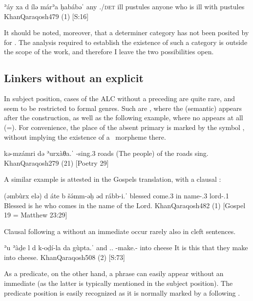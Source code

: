 {ʾáy\cb{} xa \opt\zero{} d\cb{} ílə márʾa ḥabábəˈ}
{any\cb{} \indef.\pro/\textsc{det} \opt\zero{} \lnk\cb{} \cop{} ill pustules}
{anyone who is ill with pustules}
{KhanQaraqosh}{479 (1) {[S:16]}}

It should be noted, moreover, that a determiner category has not been posited by \citeauthor{KhanQaraqosh} for \Qar. The analysis required to establish the existence of such a category is outside the scope of the work, and therefore I leave the two possibilities open.


\subsection{Linkers without an explicit \prim} \label{ss:Qar_ALC_noPrim}


In subject position, cases of the ALC without a preceding \prim are quite rare, and seem to be restricted to formal genres. Such are , where the (semantic) \prim appears after the construction, as well as the following example, where no \prim appears at all (=). For convenience, the place of the absent primary is marked by the symbol \zero, without implying the existence of a \zero\ morpheme there.

{kə-mzámri \zero{} də\cb{} ʾurxàθa.ˈ}
{\ind-sing.3\pl{} \zero{} \lnk\cb{} roads}
{(The people) of the roads sing.}
{KhanQaraqosh}{279 (21) {[Poetry 29]}}\antipar 

\newpage 

A similar example is attested in the Gospels translation, with a clausal \secn:

{(əmbùrx \cb{}elə) \zero{} d\cb{} áte  b\cb{} šə́mm-əḥ əd\cb{} rább-i.ˈ}
{blessed \cb{}\cop{} \zero{} \lnk\cb{} come.3\masc{} in\cb{} name-\poss.3\masc{} \lnk\cb{} lord-\poss.1\sg}
{Blessed is he who comes in the name of the Lord.}
{KhanQaraqosh}{482 (1) {[Gospel 19 = Matthew 23:29]}}

Clausal \secns following a \lnk* without an immediate \prim occur rarely also in cleft sentences.

{ʾu\cb{} ʾàḏe \cb{}l \zero{} d\cb{} k-oḏí-la da\cb{} gùpta.ˈ}
{and\cb{} \dem.\near.\masc{} \cb{}\cop{} \zero{} \lnk\cb{} \ind-make.\pl-\fem{} into\cb{} cheese}
{It is this that they make into cheese.}
{KhanQaraqosh}{508 (2) {[S:73]}}



As a predicate, on the other hand, a \lnk* phrase can easily appear without an immediate \prim (as the latter is typically mentioned in the subject position). The predicate position is easily recognized as it is normally marked by a following .

